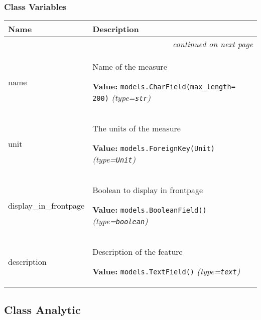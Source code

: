   \subsubsection{Class Variables}

    \vspace{-1cm}
\hspace{\varindent}\begin{longtable}{|p{\varnamewidth}|p{\vardescrwidth}|l}
\cline{1-2}
\cline{1-2} \centering \textbf{Name} & \centering \textbf{Description}& \\
\cline{1-2}
\endhead\cline{1-2}\multicolumn{3}{r}{\small\textit{continued on next page}}\\\endfoot\cline{1-2}
\endlastfoot\raggedright n\-a\-m\-e\- & \raggedright Name of the measure

\textbf{Value:} 
{\tt models.CharField(max\_length= 200)}            {\it (type=\texttt{str})}&\\
\cline{1-2}
\raggedright u\-n\-i\-t\- & \raggedright The units of the measure

\textbf{Value:} 
{\tt models.ForeignKey(Unit)}            {\it (type=\texttt{Unit})}&\\
\cline{1-2}
\raggedright d\-i\-s\-p\-l\-a\-y\-\_\-i\-n\-\_\-f\-r\-o\-n\-t\-p\-a\-g\-e\- & \raggedright Boolean to display in frontpage

\textbf{Value:} 
{\tt models.BooleanField()}            {\it (type=\texttt{boolean})}&\\
\cline{1-2}
\raggedright d\-e\-s\-c\-r\-i\-p\-t\-i\-o\-n\- & \raggedright Description of the feature

\textbf{Value:} 
{\tt models.TextField()}            {\it (type=\texttt{text})}&\\
\cline{1-2}
\end{longtable}



\subsection{Class Analytic}

